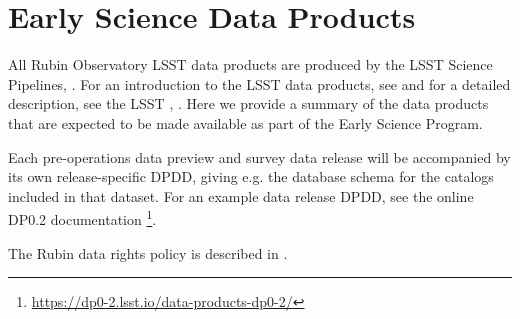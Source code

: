 \section{Early Science Data Products}
\label{sec:data}

All Rubin Observatory LSST data products are produced by the LSST Science Pipelines, \cite{2019ASPC..523..521B,2018PASJ...70S...5B}. 
For an introduction to the LSST data products, see \citet{RubinDataProductsAbridged} and for a detailed description, see the LSST \dpdd,  \citet{LSE-163}.
Here we provide a summary of the data products that are expected to be made available as part of the Early Science Program.

Each pre-operations data preview and survey data release will be accompanied by its own release-specific DPDD, giving e.g. the  database schema for the catalogs included in that dataset.
For an example data release DPDD, see the online DP0.2 documentation \footnote{\url{https://dp0-2.lsst.io/data-products-dp0-2/}}.

The Rubin data rights policy is described in  \cite{RDO-013}.

